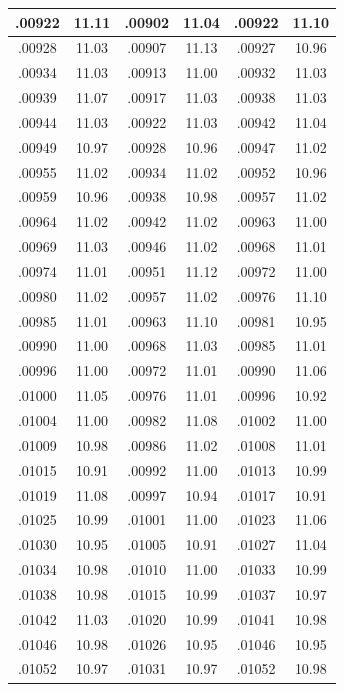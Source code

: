 \documentclass[10pt,twoside]{report}
\begin{document}
\begin{appendices}
\begin{longtable}{|c|c||c|c||c|c|}
.00922 & 11.11 & .00902 & 11.04 & .00922 & 11.10\\\hline
.00928 & 11.03 & .00907 & 11.13 & .00927 & 10.96\\\hline
.00934 & 11.03 & .00913 & 11.00 & .00932 & 11.03\\\hline
.00939 & 11.07 & .00917 & 11.03 & .00938 & 11.03\\\hline
.00944 & 11.03 & .00922 & 11.03 & .00942 & 11.04\\\hline
.00949 & 10.97 & .00928 & 10.96 & .00947 & 11.02\\\hline
.00955 & 11.02 & .00934 & 11.02 & .00952 & 10.96\\\hline
.00959 & 10.96 & .00938 & 10.98 & .00957 & 11.02\\\hline
.00964 & 11.02 & .00942 & 11.02 & .00963 & 11.00\\\hline
.00969 & 11.03 & .00946 & 11.02 & .00968 & 11.01\\\hline
.00974 & 11.01 & .00951 & 11.12 & .00972 & 11.00\\\hline
.00980 & 11.02 & .00957 & 11.02 & .00976 & 11.10\\\hline
.00985 & 11.01 & .00963 & 11.10 & .00981 & 10.95\\\hline
.00990 & 11.00 & .00968 & 11.03 & .00985 & 11.01\\\hline
.00996 & 11.00 & .00972 & 11.01 & .00990 & 11.06\\\hline
.01000 & 11.05 & .00976 & 11.01 & .00996 & 10.92\\\hline
.01004 & 11.00 & .00982 & 11.08 & .01002 & 11.00\\\hline
.01009 & 10.98 & .00986 & 11.02 & .01008 & 11.01\\\hline
.01015 & 10.91 & .00992 & 11.00 & .01013 & 10.99\\\hline
.01019 & 11.08 & .00997 & 10.94 & .01017 & 10.91\\\hline
.01025 & 10.99 & .01001 & 11.00 & .01023 & 11.06\\\hline
.01030 & 10.95 & .01005 & 10.91 & .01027 & 11.04\\\hline
.01034 & 10.98 & .01010 & 11.00 & .01033 & 10.99\\\hline
.01038 & 10.98 & .01015 & 10.99 & .01037 & 10.97\\\hline
.01042 & 11.03 & .01020 & 10.99 & .01041 & 10.98\\\hline
.01046 & 10.98 & .01026 & 10.95 & .01046 & 10.95\\\hline
.01052 & 10.97 & .01031 & 10.97 & .01052 & 10.98\\\hline

\end{longtable}
\end{appendices}
\end{document}
